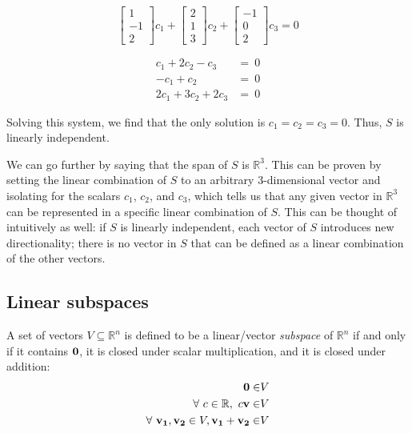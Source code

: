\documentclass[../main.tex]{subfiles}
\begin{document}
\begin{solution}
	$$\begin{bmatrix} 1 \\ -1 \\ 2 \end{bmatrix}c_1
		+ \begin{bmatrix} 2 \\ 1 \\ 3 \end{bmatrix}c_2
		+ \begin{bmatrix} -1 \\ 0 \\ 2 \end{bmatrix}c_3 = 0$$

	\begin{equation*}
		\begin{split}
			c_1+2c_2-c_3   & =    \ 0     \\
			-c_1+c_2       & =        \ 0 \\
			2c_1+3c_2+2c_3 & =  \ 0
		\end{split}
	\end{equation*}

	Solving this system, we find that the only solution is
	$c_1=c_2=c_3=0$. Thus, $S$ is linearly independent. \qedsymbol
\end{solution}

We can go further by saying that the span of $S$ is $\mathbb{R}^3$. This
can be proven by setting the linear combination of $S$ to an
arbitrary 3-dimensional vector and isolating for the scalars $c_1$, $c_2$, and $c_3$,
which tells us that any given vector in $\mathbb{R}^3$ can be represented
in a specific linear combination of $S$. This can be thought of intuitively as well:
if $S$ is linearly independent, each vector of $S$ introduces
new directionality; there is no vector in $S$ that can be defined as a linear
combination of the other vectors.

\subsection{Linear subspaces}

\begin{definition}
	A set of vectors $V \subseteq \mathbb{R}^n$ is defined to be a linear/vector \textit{subspace}
	of $\mathbb{R}^n$ if and only if it contains $\mathbf{0}$,
	it is closed under scalar multiplication, and it is closed under addition:
	\begin{align*}
		\mathbf{0} \in                                                       & V \\
		\forall\ c \in \mathbb{R},\ c\mathbf{v} \in                          & V \\
		\forall\ \mathbf{v_1}, \mathbf{v_2} \in V, \mathbf{v_1} + \mathbf{v_2} \in & V
	\end{align*}
\end{definition}
\end{document}
